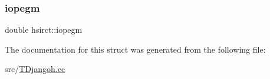 \mbox{\label{structhsirct_a2ec6a54f3f5d6fabc351b553cf77b304}} 
\subsubsection{\texorpdfstring{iopegm}{iopegm}}
{\footnotesize\ttfamily double hsirct\+::iopegm}



The documentation for this struct was generated from the following file\+:\begin{DoxyCompactItemize}
\item 
src/\hyperlink{_t_djangoh_8cc}{T\+Djangoh.\+cc}\end{DoxyCompactItemize}
